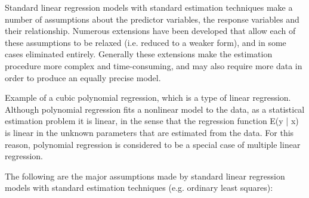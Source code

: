 Standard linear regression models with standard estimation techniques make a number of 
assumptions about the predictor variables, the response variables and their relationship.
Numerous extensions have been developed that allow each of these assumptions to be relaxed 
(i.e. reduced to a weaker form), and in some cases eliminated entirely. 
Generally these extensions make the estimation procedure more complex and time-consuming,
and may also require more data in order to produce an equally precise model.

Example of a cubic polynomial regression, which is a type of linear regression. 
Although polynomial regression fits a nonlinear model to the data, as 
a statistical estimation problem it is linear, in the sense that the regression 
function E(y | x) is linear in the unknown parameters that are estimated from the data. 
For this reason, polynomial regression is considered to be a special case of 
multiple linear regression.

The following are the major assumptions made by standard linear regression models with 
standard estimation techniques (e.g. ordinary least squares):

